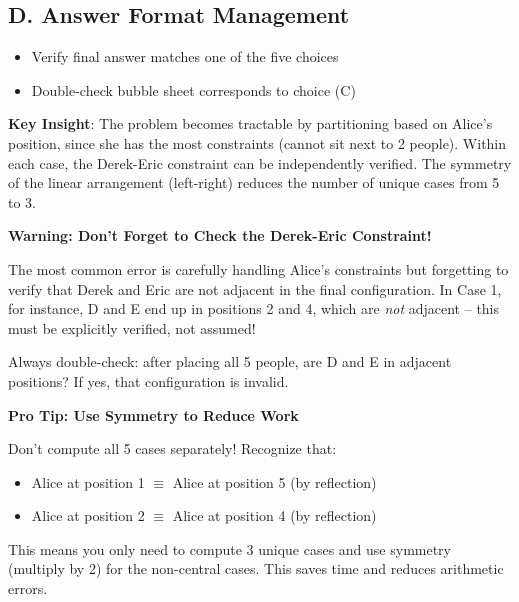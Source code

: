 \documentclass[]{article}
\begin{document}
\begin{competitionbox}
\subsection*{D. Answer Format Management}
\begin{itemize}[leftmargin=*]
    \item Verify final answer matches one of the five choices
    \item Double-check bubble sheet corresponds to choice (C)
\end{itemize}
\end{competitionbox}

\begin{keyinsightbox}
\textbf{Key Insight}: The problem becomes tractable by partitioning based on Alice's position, since she has the most constraints (cannot sit next to 2 people). Within each case, the Derek-Eric constraint can be independently verified. The symmetry of the linear arrangement (left-right) reduces the number of unique cases from 5 to 3.
\end{keyinsightbox}

\begin{warningbox}
\textbf{Warning: Don't Forget to Check the Derek-Eric Constraint!}

The most common error is carefully handling Alice's constraints but forgetting to verify that Derek and Eric are not adjacent in the final configuration. In Case 1, for instance, D and E end up in positions 2 and 4, which are \emph{not} adjacent -- this must be explicitly verified, not assumed!

Always double-check: after placing all 5 people, are D and E in adjacent positions? If yes, that configuration is invalid.
\end{warningbox}

\begin{tipbox}
\textbf{Pro Tip: Use Symmetry to Reduce Work}

Don't compute all 5 cases separately! Recognize that:
\begin{itemize}[leftmargin=*]
    \item Alice at position 1 $\equiv$ Alice at position 5 (by reflection)
    \item Alice at position 2 $\equiv$ Alice at position 4 (by reflection)
\end{itemize}

This means you only need to compute 3 unique cases and use symmetry (multiply by 2) for the non-central cases. This saves time and reduces arithmetic errors.
\end{tipbox}
\end{document}
